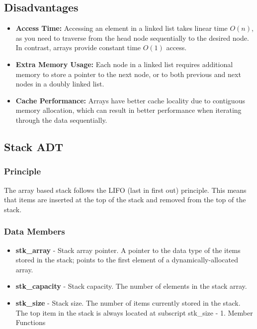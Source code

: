 \documentclass{report}
\begin{document}
    \bigbreak \noindent 
    \subsection{Disadvantages}
    \begin{itemize}
        \item \textbf{Access Time:} Accessing an element in a linked list takes linear time $O(n)$, as you need to traverse from the head node sequentially to the desired node. In contrast, arrays provide constant time $O(1)$ access.
        \item \textbf{Extra Memory Usage:} Each node in a linked list requires additional memory to store a pointer to the next node, or to both previous and next nodes in a doubly linked list.
        \item \textbf{Cache Performance:} Arrays have better cache locality due to contiguous memory allocation, which can result in better performance when iterating through the data sequentially.
    \end{itemize}

    \bigbreak \noindent 
    \pagebreak 
     \bigbreak \noindent 
     \subsection{Stack ADT}
     \bigbreak \noindent 
     \subsubsection{Principle}
     \bigbreak \noindent 
     The array based stack follows the LIFO (last in first out) principle. This means that items are inserted at the top of the stack and removed from the top of the stack.
     \bigbreak \noindent 
     \subsubsection{Data Members}
     \begin{itemize}
         \item \textbf{stk\_array} - Stack array pointer. A pointer to the data type of the items stored in the stack; points to the first element of a dynamically-allocated array.
         \item \textbf{stk\_capacity} - Stack capacity. The number of elements in the stack array.
         \item \textbf{stk\_size} - Stack size. The number of items currently stored in the stack. The top item in the stack is always located at subscript stk\_size - 1. Member Functions
     \end{itemize}
     \bigbreak \noindent 
\end{document}
